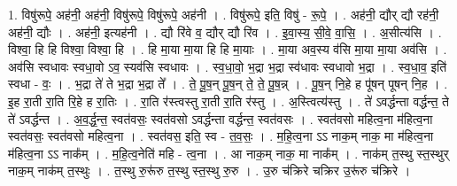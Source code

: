 \documentclass[17pt]{extarticle}
\begin{document}
1. विषु॑रूपे॒ अह॑नी॒ अह॑नी॒ विषु॑रूपे॒ विषु॑रूपे॒ अह॑नी । . विषु॑रूपे॒ इति॒ विषु॑ - रू॒पे॒ । . अह॑नी॒ द्यौर् द्यौ रह॑नी॒ अह॑नी॒ द्यौः । . अह॑नी॒ इत्यह॑नी । . द्यौ रि॑वे व॒ द्यौर् द्यौ रि॑व । . इ॒वा॒स्य॒ सी॒वे॒ वा॒सि॒ । . अ॒सीत्य॑सि । . विश्वा॒ हि हि विश्वा॒ विश्वा॒ हि । . हि मा॒या मा॒या हि हि मा॒याः । . मा॒या अव॒स्य व॑सि मा॒या मा॒या अव॑सि । . अव॑सि स्वधावः स्वधा॒वो ऽव॒ स्यव॑सि स्वधावः । . स्व॒धा॒वो॒ भ॒द्रा भ॒द्रा स्व॑धावः स्वधावो भ॒द्रा । . स्व॒धा॒व॒ इति॑ स्वधा - वः॒ । . भ॒द्रा ते॑ ते भ॒द्रा भ॒द्रा ते᳚ । . ते॒ पू॒ष॒न् पू॒ष॒न् ते॒ ते॒ पू॒ष॒न्न् । . पू॒ष॒न् नि॒हे ह पू॑षन् पूषन् नि॒ह । . इ॒ह रा॒ती रा॒ति रि॒हे ह रा॒तिः । . रा॒ति र॑स्त्वस्तु रा॒ती रा॒ति र॑स्तु । . अ॒स्त्वित्य॑स्तु । . ते॑ ऽवर्द्धन्ता वर्द्धन्त॒ ते ते॑ ऽवर्द्धन्त । . अ॒व॒र्द्ध॒न्त॒ स्वत॑वसः॒ स्वत॑वसो ऽवर्द्धन्ता वर्द्धन्त॒ स्वत॑वसः । . स्वत॑वसो महित्व॒ना म॑हित्व॒ना स्वत॑वसः॒ स्वत॑वसो महित्व॒ना । . स्वत॑वस॒ इति॒ स्व - त॒व॒सः॒ । . म॒हि॒त्व॒ना ऽऽ नाक॒म् नाक॒ मा म॑हित्व॒ना म॑हित्व॒ना ऽऽ नाक᳚म् । . म॒हि॒त्व॒नेति॑ महि - त्व॒ना । . आ नाक॒म् नाक॒ मा नाक᳚म् । . नाक॑म् त॒स्थु स्त॒स्थुर् नाक॒म् नाक॑म् त॒स्थुः । . त॒स्थु रु॒रू॑रु त॒स्थु स्त॒स्थु रु॒रु । . उ॒रु च॑क्रिरे चक्रिर उ॒रू॑रु च॑क्रिरे । \newline
\end{document}
